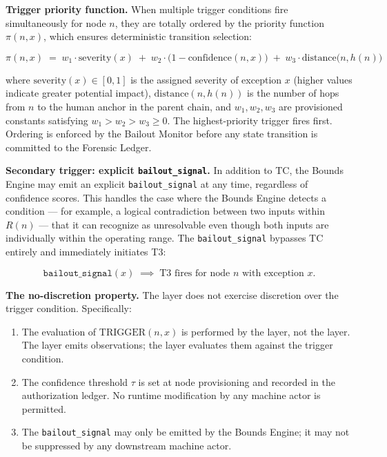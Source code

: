 \bigskip
\noindent\textbf{Trigger priority function.} When multiple trigger conditions fire simultaneously for node $n$, they are totally ordered by the priority function $\pi(n, x)$, which ensures deterministic transition selection:

\begin{equation}
\pi(n, x) \;=\; w_1 \cdot \text{severity}(x) \;+\; w_2 \cdot \bigl(1 - \text{confidence}(n, x)\bigr) \;+\; w_3 \cdot \text{distance}\bigl(n, h(n)\bigr) \tag{PF}
\end{equation}

where $\text{severity}(x) \in [0, 1]$ is the assigned severity of exception $x$ (higher values indicate greater potential impact), $\text{distance}(n, h(n))$ is the number of hops from $n$ to the human anchor in the parent chain, and $w_1, w_2, w_3$ are provisioned constants satisfying $w_1 > w_2 > w_3 \geq 0$. The highest-priority trigger fires first. Ordering is enforced by the Bailout Monitor before any state transition is committed to the Forensic Ledger.

\bigskip
\noindent\textbf{Secondary trigger: explicit \texttt{bailout\_signal}.} In addition to TC, the Bounds Engine may emit an explicit \texttt{bailout\_signal} at any time, regardless of confidence scores. This handles the case where the Bounds Engine detects a condition --- for example, a logical contradiction between two inputs within $R(n)$ --- that it can recognize as unresolvable even though both inputs are individually within the operating range. The \texttt{bailout\_signal} bypasses TC entirely and immediately initiates T3:

\begin{equation}
\texttt{bailout\_signal}(x) \;\implies\; \text{T3 fires for node } n \text{ with exception } x. \tag{TC-secondary}
\end{equation}

\bigskip
\noindent\textbf{The no-discretion property.} The \bounds{} layer does not exercise discretion over the trigger condition. Specifically:

\begin{enumerate}
    \item The evaluation of $\text{TRIGGER}(n, x)$ is performed by the \fact{} layer, not the \bounds{} layer. The \bounds{} layer emits observations; the \fact{} layer evaluates them against the trigger condition.
    \item The confidence threshold $\tau$ is set at node provisioning and recorded in the authorization ledger. No runtime modification by any machine actor is permitted.
    \item The \texttt{bailout\_signal} may only be emitted by the Bounds Engine; it may not be suppressed by any downstream machine actor.
\end{enumerate}

